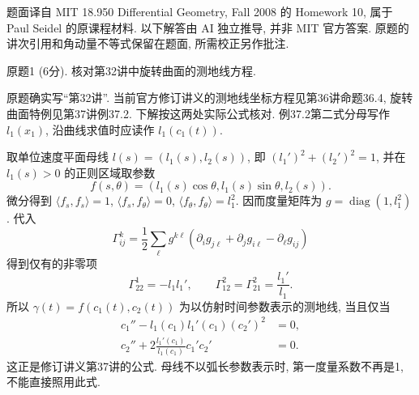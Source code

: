 \par{}
题面译自 MIT 18.950 Differential Geometry, Fall 2008 的 Homework 10, 属于 Paul Seidel 的原课程材料. 以下解答由 AI 独立推导, 并非 MIT 官方答案. 原题的讲次引用和角动量不等式保留在题面, 所需校正另作批注.

\par{}
\begin{exercise}\label{ps:10-1}
原题1 (6分). 核对第32讲中旋转曲面的测地线方程.
\end{exercise}
\begin{remark}
原题确实写“第32讲”. 当前官方修订讲义的测地线坐标方程见第36讲命题36.4, 旋转曲面特例见第37讲例37.2. 下解按这两处实际公式核对. 例37.2第二式分母写作 $l_1(x_1)$, 沿曲线求值时应读作 $l_1(c_1(t))$.
\end{remark}
\begin{solution}
取单位速度平面母线 $l(s)=(l_1(s),l_2(s))$, 即 $(l_1')^2+(l_2')^2=1$, 并在 $l_1(s)>0$ 的正则区域取参数
\[
 f(s,\theta)=(l_1(s)\cos\theta,l_1(s)\sin\theta,l_2(s)).
\]
微分得到 $\langle f_s,f_s\rangle=1$, $\langle f_s,f_\theta\rangle=0$, $\langle f_\theta,f_\theta\rangle=l_1^2$. 因而度量矩阵为 $g=\operatorname{diag}(1,l_1^2)$. 代入
\[
 \Gamma^k_{ij}=\frac12\sum_\ell g^{k\ell}
 (\partial_i g_{j\ell}+\partial_j g_{i\ell}-\partial_\ell g_{ij})
\]
得到仅有的非零项
\[
 \Gamma^1_{22}=-l_1l_1',\qquad
 \Gamma^2_{12}=\Gamma^2_{21}=\frac{l_1'}{l_1}.
\]
所以 $\gamma(t)=f(c_1(t),c_2(t))$ 为以仿射时间参数表示的测地线, 当且仅当
\begin{align*}
 c_1''-l_1(c_1)l_1'(c_1)(c_2')^2&=0,\\
 c_2''+2\frac{l_1'(c_1)}{l_1(c_1)}c_1'c_2'&=0.
\end{align*}
这正是修订讲义第37讲的公式. 母线不以弧长参数表示时, 第一度量系数不再是1, 不能直接照用此式.
\end{solution}

